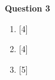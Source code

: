\par
\noindent
\textbf{Question 3}\\
\begin{enumerate}[label=(\roman*)]

    \item \hfill [4]

    \item \hfill [4]

    \item \hfill [5]

\end{enumerate}
